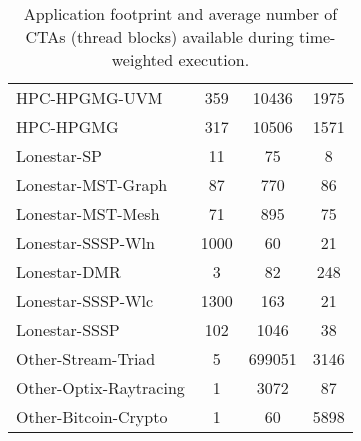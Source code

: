 \begin{table}[t]
\begin{small}
\begin{tabular}{lccc}
HPC-HPGMG-UVM & 359 & 10436 & 1975 \\
HPC-HPGMG & 317 & 10506 & 1571 \\
Lonestar-SP & 11 & 75 & 8 \\
Lonestar-MST-Graph & 87 & 770 & 86 \\
Lonestar-MST-Mesh & 71 & 895 & 75 \\
Lonestar-SSSP-Wln & 1000 & 60 & 21 \\
Lonestar-DMR & 3 & 82 & 248 \\
Lonestar-SSSP-Wlc & 1300 & 163 & 21 \\
Lonestar-SSSP & 102 & 1046 & 38 \\
Other-Stream-Triad & 5 & 699051 & 3146 \\
Other-Optix-Raytracing & 1 & 3072 & 87 \\
Other-Bitcoin-Crypto & 1 & 60 & 5898 \\
\toprule
\end{tabular}
\caption{Application footprint and average number of CTAs (thread blocks) 
available during time-weighted execution.}
\label{tab:numctas}
\end{small}
\end{table}